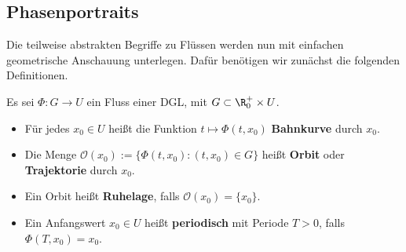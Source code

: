 \documentclass[letterpaper,10pt,english]{jupyterBook}
\begin{document}
\subsection{Phasenportraits}
\label{\detokenize{ode/fluesse:phasenportraits}}
Die teilweise abstrakten Begriffe zu Flüssen werden nun mit einfachen geometrische Anschauung unterlegen. Dafür benötigen wir zunächst die folgenden Definitionen.
\label{ode/fluesse:definition-5}
\begin{definition}{}{}



Es sei \(\Phi:G\rightarrow U\) ein Fluss einer DGL, mit \(G\subset \R^+_0\times U\).
\begin{itemize}
\item {} 
Für jedes \(x_0\in U\) heißt die Funktion \(t\mapsto \Phi(t, x_0)\) \textbf{Bahnkurve} durch \(x_0\).

\item {} 
Die Menge \(\mathcal{O}(x_0) := \{\Phi(t, x_0): (t, x_0)\in G\}\) heißt \textbf{Orbit} oder \textbf{Trajektorie} durch \(x_0\).

\item {} 
Ein Orbit heißt \textbf{Ruhelage}, falls \(\mathcal{O}(x_0) = \{x_0\}\).

\item {} 
Ein Anfangswert \(x_0\in U\) heißt \textbf{periodisch} mit Periode \(T>0\), falls \(\Phi(T, x_0) = x_0\).

\end{itemize}
\end{definition}
\label{ode/fluesse:example-6}
\end{document}

